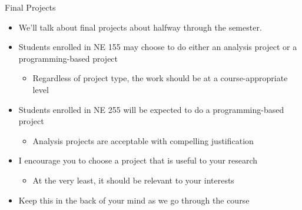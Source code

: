 \documentclass[xcolor=x11names]{beamer}
\begin{document}
\begin{frame}{Final Projects}
\begin{itemize}
\item We'll talk about final projects about halfway through the semester.
\item Students enrolled in NE 155 may choose to do either an analysis project
      or a programming-based project
      \begin{itemize}
      \item{Regardless of project type, the work should be at a
            course-appropriate level}
      \end{itemize}
\item Students enrolled in NE 255 will be expected to do a programming-based
      project
      \begin{itemize}
      \item{Analysis projects are acceptable with compelling justification}
      \end{itemize}
\item I encourage you to choose a project that is useful to your research
  \begin{itemize}
  \item{At the very least, it should be relevant to your interests}
  \end{itemize}
\item Keep this in the back of your mind as we go through the course
\end{itemize}

\end{frame}
\end{document}

